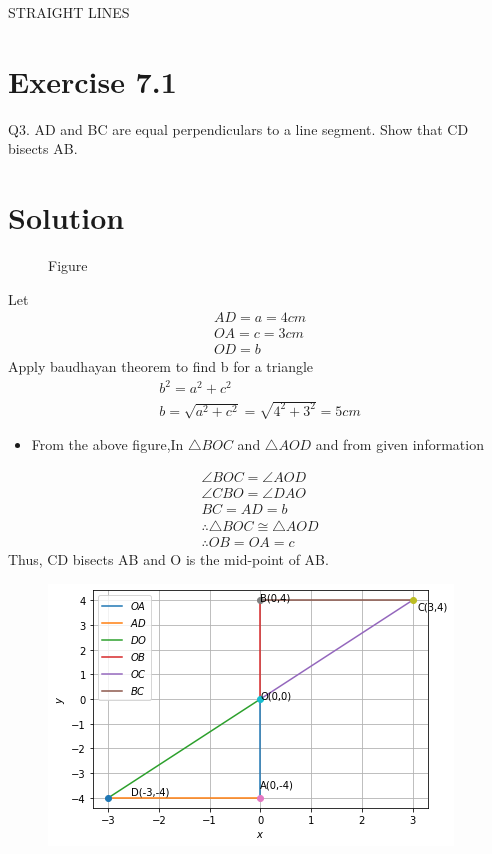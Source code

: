 \documentclass[12pt]{article}
\begin{document}
\begin{center}
\textbf\large{ STRAIGHT LINES}
\end{center}
\section*{Exercise 7.1}
Q3. AD and BC are equal perpendiculars to a line segment. Show that CD bisects AB.
\section*{Solution}

\begin{figure}[!h]
\begin{center}
\resizebox{0.3\linewidth}{!}
{

}
\caption{Figure}
\label{fig:foo}
\end{center}
\end{figure}
Let
\begin{align}
    AD=a=4cm \\
    OA=c=3cm \\
    OD=b
\end{align}
Apply baudhayan theorem to find b for a triangle 
\begin{align}
    b^2=a^2+c^2\\
    b=\sqrt{a^2+c^2}=\sqrt{4^2+3^2}=5cm
\end{align}
\begin{itemize}
    \item  From the above figure,In $\triangle{BOC}$ and $\triangle{AOD}$ and from given information
\end{itemize}
    \begin{align}
    \angle BOC = \angle AOD 
    \label{eq:ang}\\
    \angle CBO = \angle DAO 
    \label{eq:ang2}\\
    BC=AD = b \\
    \therefore \triangle{BOC} \cong \triangle{AOD}\\
    \therefore OB=OA= c
    \end{align}
Thus, CD bisects AB and O is the mid-point of AB.
\begin{figure}[!h]
 \begin{center}
  \includegraphics[width=\columnwidth]{./figs/python_fig.png}
 \end{center}
\caption{}
\label{fig:Python Generated Figure}
\end{figure}
\end{document}
